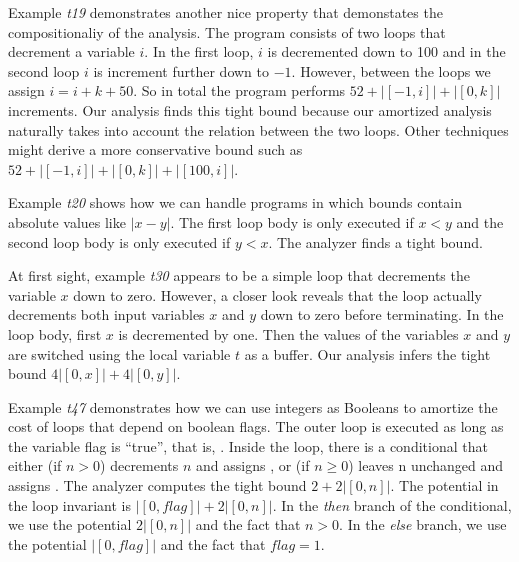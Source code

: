 \documentclass[nocopyrightspace,preprint]{sigplanconf}
\begin{document}
Example \emph{t19} demonstrates another nice property that demonstates
the compositionaliy of the analysis.  The program consists of two
loops that decrement a variable $i$.  In the first loop, $i$ is
decremented down to 100 and in the second loop $i$ is increment
further down to $-1$.  However, between the loops we assign
$i=i+k+50$.  So in total the program performs $52 + |[-1,i]| +
|[0,k]|$ increments.  Our analysis finds this tight bound because our
amortized analysis naturally takes into account the relation between
the two loops.  Other techniques might derive a more conservative
bound such as $52 + |[-1,i]| + |[0,k]| + |[100,i]|$.

Example \emph{t20} shows how we can handle programs in which bounds
contain absolute values like $|x-y|$.  The first loop body is only
executed if $x<y$ and the second loop body is only executed if $y<x$.
The analyzer finds a tight bound.

At first sight, example \emph{t30} appears to be a simple loop that
decrements the variable $x$ down to zero.  However, a closer look
reveals that the loop actually decrements both input variables $x$ and
$y$ down to zero before terminating.  In the loop body, first $x$ is
decremented by one.  Then the values of the variables $x$ and $y$ are
switched using the local variable $t$ as a buffer.  Our analysis
infers the tight bound $4|[0,x]|+4|[0,y]|$.

Example \emph{t47} demonstrates how we can use integers as Booleans to
amortize the cost of loops that depend on boolean flags.  The outer
loop is executed as long as the variable flag is ``true'', that is,
.  Inside the loop, there is a conditional that either
(if $n>0$) decrements $n$ and assigns , or (if $n\geq0$)
leaves n unchanged and assigns .  The analyzer computes
the tight bound $2 + 2|[0, n]|$.  The potential in the loop invariant
is $|[0,\mathit{flag}]| + 2|[0, n]|$.  In the \emph{then} branch of
the conditional, we use the potential $2|[0, n]|$ and the fact that
$n>0$.  In the \emph{else} branch, we use the potential
$|[0,\mathit{flag}]|$ and the fact that $\mathit{flag}=1$.
\end{document}
